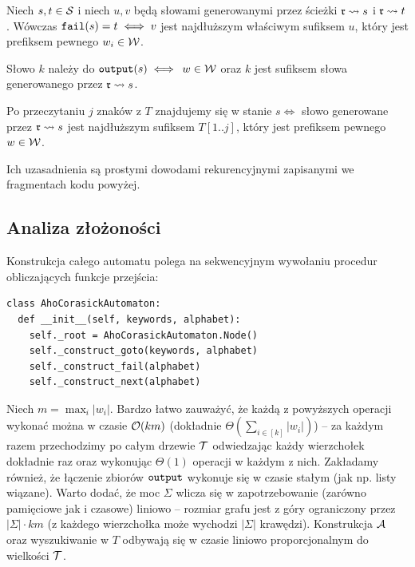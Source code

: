 \begin{lemma}{}{}
Niech $s,t\in\operatorname{\mathcal{S}}$ i niech $u, v$ będą słowami generowanymi przez ścieżki $\operatorname{\mathfrak{r}}\rightsquigarrow s$ i $\operatorname{\mathfrak{r}}\rightsquigarrow t$. Wówczas $\operatorname{\texttt{fail}}(s) = t \iff v$ jest najdłuższym właściwym sufiksem $u$, który jest prefiksem pewnego $w_i\in\operatorname{\mathcal{W}}$.
\end{lemma}

\begin{lemma}{}{}
Słowo $k$ należy do $\operatorname{\texttt{output}}(s)\iff$ $w\in\operatorname{\mathcal{W}}$ oraz $k$ jest sufiksem słowa generowanego przez $\operatorname{\mathfrak{r}}\rightsquigarrow s$.
\end{lemma}

\begin{lemma}{}{}
Po przeczytaniu $j$ znaków z $T$ znajdujemy się w stanie $s\iff$ słowo generowane przez $\operatorname{\mathfrak{r}}\rightsquigarrow s$ jest najdłuższym sufiksem $T[1..j]$, który jest prefiksem pewnego $w\in\operatorname{\mathcal{W}}$.
\end{lemma}

\noindent Ich uzasadnienia są prostymi dowodami rekurencyjnymi zapisanymi we fragmentach kodu powyżej.

\subsection{Analiza złożoności}
Konstrukcja całego automatu polega na sekwencyjnym wywołaniu procedur obliczających funkcje przejścia:

\begin{verbatim}
class AhoCorasickAutomaton:
  def __init__(self, keywords, alphabet):
    self._root = AhoCorasickAutomaton.Node()
    self._construct_goto(keywords, alphabet)
    self._construct_fail(alphabet)
    self._construct_next(alphabet)
\end{verbatim}

Niech $m=\max_i |w_i|$. Bardzo łatwo zauważyć, że każdą z powyższych operacji wykonać można w czasie $\operatorname{\mathcal{O}}(km)$ (dokładnie $\Theta(\sum_{i\in[k]}|w_i|)$) -- za każdym razem przechodzimy po całym drzewie $\operatorname{\mathcal{T}}$ odwiedzając każdy wierzchołek dokładnie raz oraz wykonując $\Theta(1)$ operacji w każdym z nich. Zakładamy również, że łączenie zbiorów $\operatorname{\texttt{output}}$ wykonuje się w czasie stałym (jak np. listy wiązane). Warto dodać, że moc $\Sigma$ wlicza się w zapotrzebowanie (zarówno pamięciowe jak i czasowe) liniowo -- rozmiar grafu jest z góry ograniczony przez $|\Sigma|\cdot km$ (z każdego wierzchołka może wychodzi $|\Sigma|$ krawędzi). Konstrukcja $\operatorname{\mathcal{A}}$ oraz wyszukiwanie w $T$ odbywają się w czasie liniowo proporcjonalnym do wielkości $\operatorname{\mathcal{T}}$.

